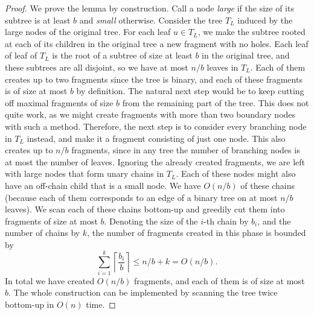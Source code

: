 \documentclass[a4paper,UKenglish]{lipics-v2016}
\theoremstyle{plain}
\begin{document}
\begin{proof}
We prove the lemma by construction. Call a node \textit{large} if the size of its subtree is at least $b$
and \textit{small} otherwise. Consider the tree $T_L$ induced by the large nodes of the original tree. 
For each leaf $u\in T_{L}$, we make the subtree rooted at each of its children in the original tree a new fragment with no holes.
Each leaf of leaf of $T_{L}$ is the root of a subtree of size at least $b$ in the original tree, and these subtrees
are all disjoint, so we have at most $n/b$ leaves in $T_{L}$. Each of them creates up to two fragments
since the tree is binary, and each of these fragments is of size at most $b$ by definition.
The natural next step would be to keep cutting off maximal fragments of size $b$ from the remaining
part of the tree. This does not quite work, as we might create fragments with more than two boundary
nodes with such a method.
Therefore, the next step is to consider every branching node in $T_{L}$ instead, and make it a fragment
consisting of just one node. This also creates up to $n/b$ fragments, since in any tree the number of
branching nodes is at most the number of leaves.
Ignoring the already created fragments, we are left with large nodes that form unary chains in $T_{L}$.
Each of these nodes might also have an off-chain child that is a small node. We have $O(n/b)$ of these chains
(because each of them corresponds to an edge of a binary tree on at most $n/b$ leaves).
We scan each of these chains bottom-up and greedily cut them into fragments of size at most $b$.
Denoting the size of the $i$-th chain by $b_{i}$, and the number of chains by $k$, the number of fragments created in this phase is
bounded by $$\sum_{i=1}^{k} \left\lceil \frac{b_i}{b} \right\rceil \leq n/b+k=O(n/b).$$
In total we have created $O(n/b)$ fragments, and each of them is of size at most $b$.
The whole construction can be implemented by scanning the tree twice bottom-up in $O(n)$ time.
\end{proof}
\end{document}
